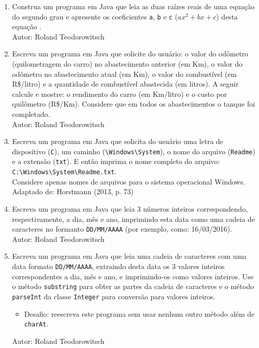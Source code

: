 \documentclass[onecolumn,a4paper,10pt]{report}
\newcommand{\+}{\, + \,}
\newcommand{\<}{\hspace*{-0.4cm}}
\begin{document}
\begin{enumerate}[1.]
\item Construa um programa em Java que leia as duas raízes reais de uma equação do segundo grau e apresente os coeficientes \texttt{a}, \texttt{b} e \texttt{c} ($ax^2+bx+c$) desta equação .\\
{\tiny Autor: Roland Teodorowitsch}

\item Escreva um programa em Java que solicite do usuário: o valor do odômetro (quilometragem do carro) no abastecimento anterior (em Km), o valor do odômetro no abastecimento atual (em Km), o valor do combustível (em R\$/litro) e a quantidade de combustível abastecida (em litros). A seguir calcule e mostre: o rendimento do carro (em Km/litro) e o custo por quilômetro (R\$/Km). Considere que em todos os abastecimentos o tanque foi completado.\\
{\tiny Autor: Roland Teodorowitsch}

\item Escreva um programa em Java que solicita do usuário uma letra de dispositivo (\texttt{C}), um caminho (\texttt{\textbackslash Windows\textbackslash System}), o nome do arquivo (\texttt{Readme}) e a extensão (\texttt{txt}). E então imprima o nome completo do arquivo:\\ \texttt{C:\textbackslash Windows\textbackslash System\textbackslash Readme.txt}.\\Considere apenas nomes de arquivos para o sistema operacional Windows.\\
{\tiny Adaptado de: Horstmann (2013, p. 73)}

\item Escreva um programa em Java que leia 3 números inteiros correspondendo, respectivamente, a dia, mês e ano, imprimindo esta data como uma cadeia de caracteres no formanto \texttt{DD/MM/AAAA} (por exemplo, como: 16/03/2016).\\
{\tiny Autor: Roland Teodorowitsch}

\item Escreva um programa em Java que leia uma cadeia de caracteres com uma data formato \texttt{DD/MM/AAAA}, extraindo desta data os 3 valores inteiros correspondentes a dia, mês e ano, e imprimindo-os como valores inteiros. Use o método \texttt{substring} para obter as partes da cadeia de caracteres e o método \texttt{parseInt} da classe \texttt{Integer} para conversão para valores inteiros.
\begin{itemize}
\item Desafio: reescreva este programa sem usar nenhum outro método além de \texttt{charAt}.
\end{itemize}
{\tiny Autor: Roland Teodorowitsch}


\end{enumerate}
\end{document}
